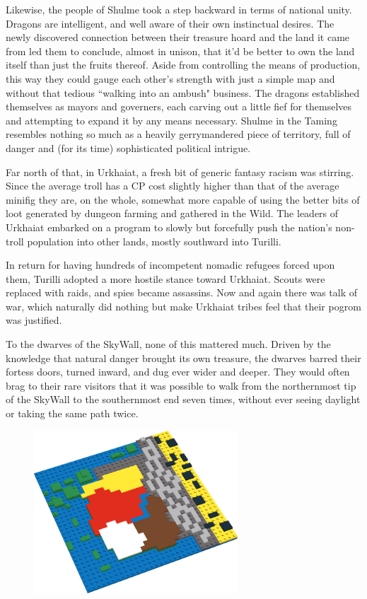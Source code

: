 \documentclass[12pt,a4paper,twocolumn]{article}
\begin{document}
Likewise, the people of Shulme took a step backward in terms of national unity.  Dragons are intelligent, and well aware of their own instinctual desires.  The newly discovered connection between their treasure hoard and the land it came from led them to conclude, almost in unison, that it'd be better to own the land itself than just the fruits thereof.  Aside from controlling the means of production, this way they could gauge each other's strength with just a simple map and without that tedious ``walking into an ambush" business.  The dragons established themselves as mayors and governers, each carving out a little fief for themselves and attempting to expand it by any means necessary.  Shulme in the Taming resembles nothing so much as a heavily gerrymandered piece of territory, full of danger and (for its time) sophisticated political intrigue.

Far north of that, in Urkhaiat, a fresh bit of generic fantasy racism was stirring.  Since the average troll has a CP cost slightly higher than that of the average minifig they are, on the whole, somewhat more capable of using the better bits of loot generated by dungeon farming and gathered in the Wild.  The leaders of Urkhaiat embarked on a program to slowly but forcefully push the nation's non-troll population into other lands, mostly southward into Turilli.

In return for having hundreds of incompetent nomadic refugees forced upon them, Turilli adopted a more hostile stance toward Urkhaiat.  Scouts were replaced with raids, and spies became assassins.  Now and again there was talk of war, which naturally did nothing but make Urkhaiat tribes feel that their pogrom was justified.

To the dwarves of the SkyWall, none of this mattered much.  Driven by the knowledge that natural danger brought its own treasure, the dwarves barred their fortess doors, turned inward, and dug ever wider and deeper.  They would often brag to their rare visitors that it was possible to walk from the northernmost tip of the SkyWall to the southernmost end seven times, without ever seeing daylight or taking the same path twice.

\begin{figure}[h]
\includegraphics[width=3in]{StruggleNations.png}
\end{figure}
\end{document}

